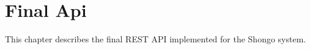 \chapter{Final Api}
This chapter describes the final REST API implemented for the Shongo system.









